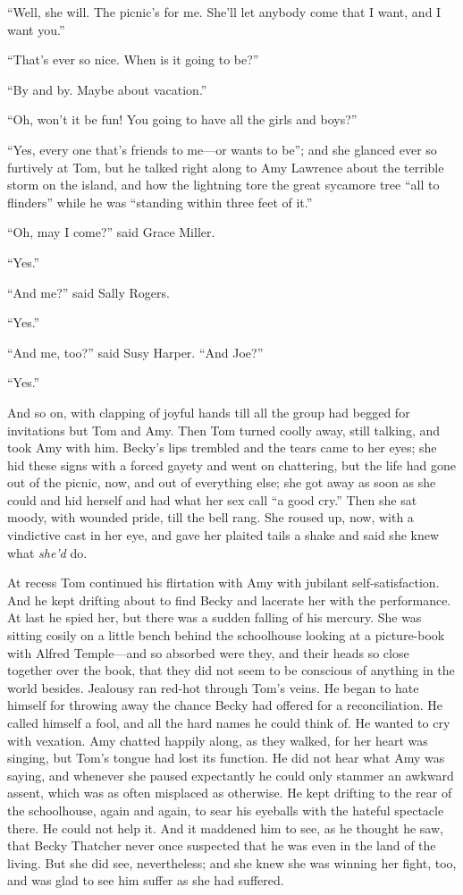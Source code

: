 \documentclass{book}
\begin{document}
“Well, she will. The picnic’s for me. She’ll let anybody come that I want, and I want you.”

“That’s ever so nice. When is it going to be?”

“By and by. Maybe about vacation.”

“Oh, won’t it be fun! You going to have all the girls and boys?”

“Yes, every one that’s friends to me—or wants to be”; and she glanced ever so furtively at Tom, but he talked right along to Amy Lawrence about the terrible storm on the island, and how the lightning tore the great sycamore tree “all to flinders” while he was “standing within three feet of it.”

“Oh, may I come?” said Grace Miller.

“Yes.”

“And me?” said Sally Rogers.

“Yes.”

“And me, too?” said Susy Harper. “And Joe?”

“Yes.”

And so on, with clapping of joyful hands till all the group had begged for invitations but Tom and Amy. Then Tom turned coolly away, still talking, and took Amy with him. Becky’s lips trembled and the tears came to her eyes; she hid these signs with a forced gayety and went on chattering, but the life had gone out of the picnic, now, and out of everything else; she got away as soon as she could and hid herself and had what her sex call “a good cry.” Then she sat moody, with wounded pride, till the bell rang. She roused up, now, with a vindictive cast in her eye, and gave her plaited tails a shake and said she knew what \emph{she’d} do.

At recess Tom continued his flirtation with Amy with jubilant self-satisfaction. And he kept drifting about to find Becky and lacerate her with the performance. At last he spied her, but there was a sudden falling of his mercury. She was sitting cosily on a little bench behind the schoolhouse looking at a picture-book with Alfred Temple—and so absorbed were they, and their heads so close together over the book, that they did not seem to be conscious of anything in the world besides. Jealousy ran red-hot through Tom’s veins. He began to hate himself for throwing away the chance Becky had offered for a reconciliation. He called himself a fool, and all the hard names he could think of. He wanted to cry with vexation. Amy chatted happily along, as they walked, for her heart was singing, but Tom’s tongue had lost its function. He did not hear what Amy was saying, and whenever she paused expectantly he could only stammer an awkward assent, which was as often misplaced as otherwise. He kept drifting to the rear of the schoolhouse, again and again, to sear his eyeballs with the hateful spectacle there. He could not help it. And it maddened him to see, as he thought he saw, that Becky Thatcher never once suspected that he was even in the land of the living. But she did see, nevertheless; and she knew she was winning her fight, too, and was glad to see him suffer as she had suffered.
\end{document}

